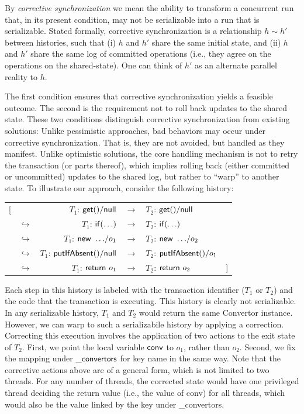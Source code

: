 
\newcommand\hrel{\sim}
%
By \emph{corrective synchronization} we mean the ability to transform a concurrent run that, in its present condition, may not be serializable into a run that is serializable. Stated formally, corrective synchronization is a relationship $h \hrel h'$ between histories, such that (i) $h$ and $h'$ share the same initial state, and (ii) $h$ and $h'$ share the same log of committed operations (i.e., they agree on the operations on the shared-state). One can think of $h'$ as an alternate parallel reality to $h$.

The first condition ensures that corrective synchronization yields a feasible outcome. The second is the requirement not to roll back updates to the shared state. These two conditions distinguish corrective synchronization from existing solutions: Unlike pessimistic approaches, bad behaviors may occur under corrective synchronization. That is, they are not avoided, but handled as they manifest. Unlike optimistic solutions, the core handling mechanism is not to retry the transaction (or parts thereof), which implies rolling back (either committed or uncommitted) updates to the shared log, but rather to ``warp'' to another state.
%
To illustrate our approach, consider the following  history: %
	\begin{center}
		\begin{tabular}{r@{}lrcl@{}l}
			[ & & $T_1$: ${\sf get()}/{\sf null}$ & $\rightarrow$ & $T_2$: ${\sf get()}/{\sf null}$  & \\
			& $\hookrightarrow$ & $T_1$: ${\sf if(\ldots)}$ & $\rightarrow$  & $T_2$: ${\sf if(\ldots)}$ & \\ 
			& $\hookrightarrow$ & $T_1$: ${\sf new\ \ldots}/o_1$ & $\rightarrow$ & $T_2$: ${\sf new\ \ldots}/o_2$ & \\ 
			& $\hookrightarrow$ & $T_1$: ${\sf putIfAbsent()}/{\sf null}$ & $\rightarrow$ & $T_2$: ${\sf putIfAbsent()}/o_1$  & \\ 
			& $\hookrightarrow$ & $T_1$: ${\sf return}\ o_1$ & $\rightarrow$ & $T_2$: ${\sf return}\ o_2$ & ]
		\end{tabular}
	\end{center}
Each step in this history is labeled with the transaction identifier ($T_1$ or $T_2$) and the code that the transaction is executing.
This history is clearly not serializable. In any serializable history, $T_1$ and $T_2$ would return the same {\sf Convertor} instance. However, we can warp to such a serializabile history by applying a correction.
%
Correcting this execution involves the application of two actions to the exit state of $T_2$. First, we point the local variable ${\sf conv}$ to $o_1$, rather than $o_2$. Second, we fix the mapping under ${\sf \_convertors}$ for key {\sf name} in the same way.
%
Note that the corrective actions above are of a general form, which is not limited to two threads. For any number of threads, the corrected state would have one privileged thread deciding the return value (i.e., the value of {\sf conv}) for all threads, which would also be the value linked by the key under {\sf \_convertors}.

